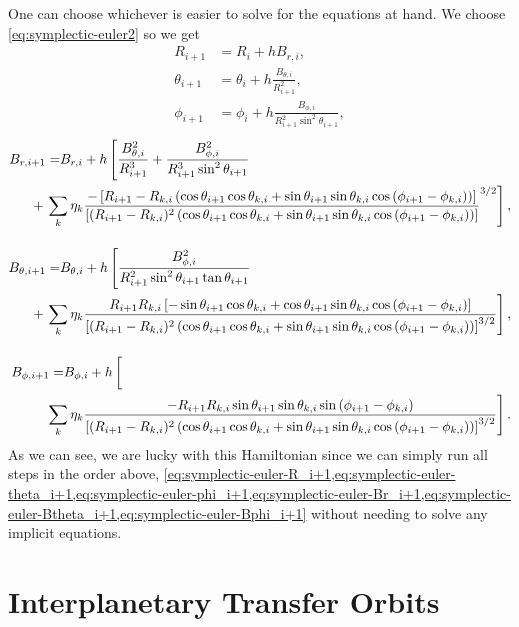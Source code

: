 One can choose whichever is easier to solve for the equations at hand. We choose \cref{eq:symplectic-euler2} so we get
\begin{align}
    R_{i+1} &= R_i + h B_{r,i} \label{eq:symplectic-euler-R_i+1}, \\[0.4cm]
    \theta_{i+1} &= \theta_i + h \frac{B_{\theta,i}}{R_{i+1}^2}, \label{eq:symplectic-euler-theta_i+1} \\[0.4cm]
    \phi_{i+1} &= \phi_i + h \frac{B_{\phi,i}}{R_{i+1}^2 \sin^2{\theta_{i+1}}}, \label{eq:symplectic-euler-phi_i+1}
\end{align}
\begin{align}    
    \begin{aligned}
        B_{r,i+1} = & B_{r,i} + h \left[ \frac{B_{\theta,i}^2}{R_{i+1}^3} + \frac{B_{\phi,i}^2}{R_{i+1}^3 \sin^2{\theta_{i+1}}} \right. \\
        & \hspace{-22.0pt} + \left. \sum\limits_{k} \eta_k \frac{-\left[R_{i+1} - R_{k,i} \left(\cos{\theta_{i+1}}\cos{\theta_{k,i}} + \sin{\theta_{i+1}}\sin{\theta_{k,i}}\cos{(\phi_{i+1} - \phi_{k,i})}\right) \right]}{\left[(R_{i+1} - R_{k,i})^2 \left(\cos{\theta_{i+1}}\cos{\theta_{k,i}} + \sin{\theta_{i+1}}\sin{\theta_{k,i}}\cos{(\phi_{i+1} - \phi_{k,i})} \right) \right]}^{3/2} \right] , \label{eq:symplectic-euler-Br_i+1}
    \end{aligned} \\[0.4cm]
    \begin{aligned}
        B_{\theta,i+1} = & B_{\theta,i} + h \left[ \frac{B_{\phi,i}^2}{R_{i+1}^2 \sin^2{\theta_{i+1}} \tan{\theta_{i+1}}} \right. \\
        & \hspace{-22.0pt} + \left. \sum\limits_{k} \eta_k \frac{R_{i+1} R_{k,i} \left[-\sin{\theta_{i+1}}\cos{\theta_{k,i}} + \cos{\theta_{i+1}}\sin{\theta_{k,i}}\cos{(\phi_{i+1} - \phi_{k,i})} \right]}{\left[(R_{i+1} - R_{k,i})^2 \left(\cos{\theta_{i+1}}\cos{\theta_{k,i}} + \sin{\theta_{i+1}}\sin{\theta_{k,i}}\cos{(\phi_{i+1} - \phi_{k,i})} \right) \right]^{3/2}} \right], \label{eq:symplectic-euler-Btheta_i+1}
    \end{aligned} \\[0.4cm]
    \begin{aligned}
        B_{\phi,i+1} = & B_{\phi,i} + h \left[ \vphantom{\frac12} \right.\\
        & \hspace{-22.0pt} \hphantom{+} \left. \sum\limits_{k} \eta_k \frac{- R_{i+1} R_{k,i} \sin{\theta_{i+1}}\sin{\theta_{k,i}}\sin{(\phi_{i+1} - \phi_{k,i})}}{\left[(R_{i+1} - R_{k,i})^2 \left(\cos{\theta_{i+1}}\cos{\theta_{k,i}} + \sin{\theta_{i+1}}\sin{\theta_{k,i}}\cos{(\phi_{i+1} - \phi_{k,i})} \right) \right]^{3/2}} \right]. \label{eq:symplectic-euler-Bphi_i+1}
    \end{aligned}
\end{align}
As we can see, we are lucky with this Hamiltonian since we can simply run all steps in the order above, \cref{eq:symplectic-euler-R_i+1,eq:symplectic-euler-theta_i+1,eq:symplectic-euler-phi_i+1,eq:symplectic-euler-Br_i+1,eq:symplectic-euler-Btheta_i+1,eq:symplectic-euler-Bphi_i+1} without needing to solve any implicit equations.

\section{Interplanetary Transfer Orbits}

